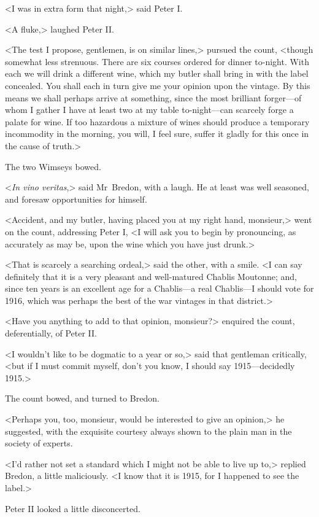 <I was in extra form that night,> said Peter I.

<A fluke,> laughed Peter II.

<The test I propose, gentlemen, is on similar lines,> pursued the count, <though somewhat less strenuous. There are six courses ordered for dinner to-night. With each we will drink a different wine, which my butler shall bring in with the label concealed. You shall each in turn give me your opinion upon the vintage. By this means we shall perhaps arrive at something, since the most brilliant forger—of whom I gather I have at least two at my table to-night—can scarcely forge a palate for wine. If too hazardous a mixture of wines should produce a temporary incommodity in the morning, you will, I feel sure, suffer it gladly for this once in the cause of truth.>

The two Wimseys bowed.

<\textit{In vino veritas},> said Mr~Bredon, with a laugh. He at least was well seasoned, and foresaw opportunities for himself.

<Accident, and my butler, having placed you at my right hand, monsieur,> went on the count, addressing Peter I, <I will ask you to begin by pronouncing, as accurately as may be, upon the wine which you have just drunk.>

<That is scarcely a searching ordeal,> said the other, with a smile. <I can say definitely that it is a very pleasant and well-matured Chablis Moutonne; and, since ten years is an excellent age for a Chablis—a real Chablis—I should vote for 1916, which was perhaps the best of the war vintages in that district.>

<Have you anything to add to that opinion, monsieur?> enquired the count, deferentially, of Peter II.

<I wouldn't like to be dogmatic to a year or so,> said that gentleman critically, <but if I must commit myself, don't you know, I should say 1915—decidedly 1915.>

The count bowed, and turned to Bredon.

<Perhaps you, too, monsieur, would be interested to give an opinion,> he suggested, with the exquisite courtesy always shown to the plain man in the society of experts.

<I'd rather not set a standard which I might not be able to live up to,> replied Bredon, a little maliciously. <I know that it is 1915, for I happened to see the label.>

Peter II looked a little disconcerted.

